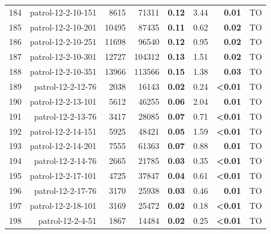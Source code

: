 \begin{longtable}{lrr@{\hskip 12pt}r@{\hskip 12pt}r@{\hskip 12pt}r@{\hskip 12pt}r@{\hskip 12pt}r}
184 & \multirow{1}{*}{patrol-12-2-10-151} & \multirow{1}{*}{8615} & \multirow{1}{*}{71311} & \textbf{0.12} & 3.44 & \textbf{0.01} & TO \\
185 & \multirow{1}{*}{patrol-12-2-10-201} & \multirow{1}{*}{10495} & \multirow{1}{*}{87435} & \textbf{0.11} & 0.62 & \textbf{0.02} & TO \\
186 & \multirow{1}{*}{patrol-12-2-10-251} & \multirow{1}{*}{11698} & \multirow{1}{*}{96540} & \textbf{0.12} & 0.95 & \textbf{0.02} & TO \\
187 & \multirow{1}{*}{patrol-12-2-10-301} & \multirow{1}{*}{12727} & \multirow{1}{*}{104312} & \textbf{0.13} & 1.51 & \textbf{0.02} & TO \\
188 & \multirow{1}{*}{patrol-12-2-10-351} & \multirow{1}{*}{13966} & \multirow{1}{*}{113566} & \textbf{0.15} & 1.38 & \textbf{0.03} & TO \\
189 & \multirow{1}{*}{patrol-12-2-12-76} & \multirow{1}{*}{2038} & \multirow{1}{*}{16143} & \textbf{0.02} & 0.24 & \textbf{<0.01} & TO \\
190 & \multirow{1}{*}{patrol-12-2-13-101} & \multirow{1}{*}{5612} & \multirow{1}{*}{46255} & \textbf{0.06} & 2.04 & \textbf{0.01} & TO \\
191 & \multirow{1}{*}{patrol-12-2-13-76} & \multirow{1}{*}{3417} & \multirow{1}{*}{28085} & \textbf{0.07} & 0.71 & \textbf{<0.01} & TO \\
192 & \multirow{1}{*}{patrol-12-2-14-151} & \multirow{1}{*}{5925} & \multirow{1}{*}{48421} & \textbf{0.05} & 1.59 & \textbf{<0.01} & TO \\
193 & \multirow{1}{*}{patrol-12-2-14-201} & \multirow{1}{*}{7555} & \multirow{1}{*}{61363} & \textbf{0.07} & 0.88 & \textbf{0.01} & TO \\
194 & \multirow{1}{*}{patrol-12-2-14-76} & \multirow{1}{*}{2665} & \multirow{1}{*}{21785} & \textbf{0.03} & 0.35 & \textbf{<0.01} & TO \\
195 & \multirow{1}{*}{patrol-12-2-17-101} & \multirow{1}{*}{4725} & \multirow{1}{*}{37847} & \textbf{0.04} & 0.61 & \textbf{<0.01} & TO \\
196 & \multirow{1}{*}{patrol-12-2-17-76} & \multirow{1}{*}{3170} & \multirow{1}{*}{25938} & \textbf{0.03} & 0.46 & \textbf{0.01} & TO \\
197 & \multirow{1}{*}{patrol-12-2-18-101} & \multirow{1}{*}{3169} & \multirow{1}{*}{25472} & \textbf{0.02} & 0.18 & \textbf{<0.01} & TO \\
198 & \multirow{1}{*}{patrol-12-2-4-51} & \multirow{1}{*}{1867} & \multirow{1}{*}{14484} & \textbf{0.02} & 0.25 & \textbf{<0.01} & TO \\

\end{longtable}
